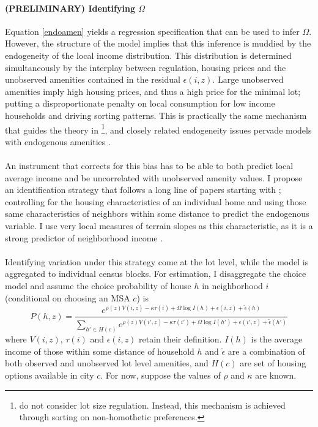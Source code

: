 \documentclass[]{article}
\begin{document}
\paragraph*{(PRELIMINARY) Identifying $\Omega$} Equation \eqref{endoamen} yields a regression specification that can be used to infer $\Omega$. However, the structure of the model implies that this inference is muddied by the endogeneity of the local income distribution. This distribution is determined simultaneously by the interplay between regulation, housing prices and the unobserved amenities contained in the residual $\epsilon(i, z)$. Large unobserved amenities imply high housing prices, and thus a high price for the minimal lot; putting a disproportionate penalty on local consumption for low income households and driving sorting patterns. This is practically the same mechanism that guides the theory in \cite{LeeandLin}\footnote{\cite{LeeandLin} do not consider lot size regulation. Instead, this mechanism is achieved through sorting on non-homothetic preferences.}, and closely related endogeneity issues pervade models with endogenous amenities \citep{diamond2016}. 

\paragraph*{}
An instrument that corrects for this bias has to be able to both predict local average income and be uncorrelated with unobserved amenity values. I propose an identification strategy that follows a long line of papers starting with \cite*{BFMJPE}; controlling for the housing characteristics of an individual home and using those same characteristics of neighbors within some distance to predict the endogenous variable. I use very local measures of terrain slopes as this characteristic, as it is a strong predictor of neighborhood income \citep{LeeandLin} \citep{saiz2010}.

\paragraph*{}
Identifying variation under this strategy come at the lot level, while the model is aggregated to individual census blocks. For estimation, I disaggregate the choice model and assume the choice probability of house $h$ in neighborhood $i$ (conditional on choosing an MSA $c$) is
\begin{equation}
P(h, z)	= \frac{e^{\rho(z) V(i, z) - \kappa\tau(i) + \Omega \log I(h) + \epsilon(i, z) + \tilde{\epsilon}(h)}}{\sum_{h' \in H(c)}e^{\rho(z) V(i', z) - \kappa\tau(i') + \Omega \log I(h') + \epsilon(i', z) + \tilde{\epsilon}(h')}}
\end{equation}
where $V(i, z)$, $\tau(i)$ and $\epsilon(i, z)$ retain their definition. $I(h)$ is the average income of those within some distance of household $h$ and $\tilde{\epsilon}$ are a combination of both observed and unobserved lot level amenities, and $H(c)$ are set of housing options available in city $c$. For now, suppose the values of $\rho$ and $\kappa$ are known.
\end{document}
